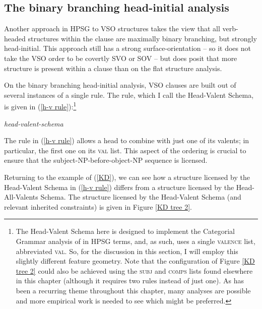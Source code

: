 \documentclass[output=paper
	        ,collection
	        ,collectionchapter
 	        ,biblatex
                ,babelshorthands
                ,newtxmath
                ,draftmode
                ,colorlinks, citecolor=brown
]{langscibook}
\begin{document}
\subsection{The binary branching head-initial analysis} 

Another approach in HPSG to VSO structures takes the view that all verb-headed structures within the clause are maximally binary branching, but strongly head-initial. This approach still has a strong surface-orientation -- so it does not take the VSO order to be covertly SVO or SOV -- but does posit that more structure is present within a clause than on the flat structure analysis. 

On the binary branching head-initial analysis, VSO clauses are built out of several instances of a single rule. The rule, which I call the Head-Valent Schema, is given in (\ref{h-v rule}):\footnote{The Head-Valent Schema here is designed to implement the Categorial Grammar analysis of \citet{keenan2000} in HPSG terms, and, as such, uses a single \textsc{valence} list, abbreviated \textsc{val}. So, for the discussion in this section, I will employ this slightly different feature geometry. Note that the configuration of Figure \ref{KD tree 2} could also be achieved using the \textsc{subj} and \textsc{comps} lists found elsewhere in this chapter (although it requires two rules instead of just one). As has been a recurring theme throughout this chapter, many analyses are possible and more empirical work is needed to see which might be preferred.} 
%
\begin{exe}
\ex \label{h-v rule}
\emph{head-valent-schema} \impl  \\
\end{exe}
%
The rule in (\ref{h-v rule}) allows a head to combine with just one of its valents; in particular, the first one on its \textsc{val} list. This aspect of the ordering is crucial to ensure that the subject-NP-before-object-NP sequence is licensed.

Returning to the  example of (\ref{KD}), we can see how a structure licensed by the Head-Valent Schema in (\ref{h-v rule}) differs from a structure licensed by the Head-All-Valents Schema. The structure licensed by the Head-Valent Schema (and relevant inherited constraints) is given in Figure \ref{KD tree 2}.
\end{document}
